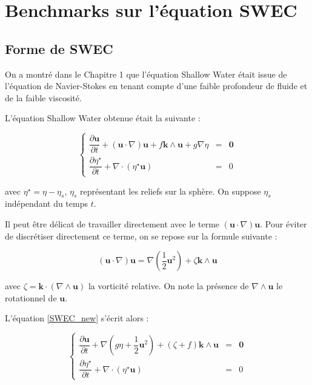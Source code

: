 \chapter{Benchmarks sur l'équation SWEC}

\section{Forme de SWEC}

On a montré dans le Chapitre 1 que l'équation Shallow Water était issue de l'équation de Navier-Stokes en tenant compte d'une faible profondeur de fluide et de la faible viscosité.

L'équation Shallow Water obtenue était la suivante :

\begin{equation}
\label{SWEC_new}
\left\lbrace
\begin{array}{rcl}
\dfrac{\partial \mathbf{u}}{\partial t} + \left( \mathbf{u} \cdot \nabla \right) \mathbf{u} + f \mathbf{k} \wedge \mathbf{u} + g \nabla \eta & = & \mathbf{0} \\
\dfrac{\partial \eta^{\star}}{\partial t} + \nabla \cdot \left( \eta^{\star} \mathbf{u} \right) & = & 0
\end{array}
\right.
\end{equation}

avec $\eta^{\star} = \eta - \eta_s$, $\eta_s$ représentant les reliefs sur la sphère. On suppose $\eta_s$ indépendant du temps $t$.

Il peut être délicat de travailler directement avec le terme $\left( \mathbf{u} \cdot \nabla \right) \mathbf{u}$. Pour éviter de discrétiser directement ce terme, on se repose sur la formule suivante :

\begin{equation}
\left( \mathbf{u} \cdot \nabla \right) \mathbf{u} = \nabla \left( \dfrac{1}{2} \mathbf{u}^2 \right) + \zeta \mathbf{k} \wedge \mathbf{u}
\end{equation}

avec $\zeta = \mathbf{k} \cdot \left( \nabla \wedge \mathbf{u} \right)$ la vorticité relative. On note la présence de $\nabla \wedge \mathbf{u}$ le rotationnel de $\mathbf{u}$.

L'équation \eqref{SWEC_new} s'écrit alors :

\begin{equation}
\label{SWEC_vectform}
\left\lbrace
\begin{array}{rcl}
\dfrac{\partial \mathbf{u}}{\partial t} + \nabla \left( g \eta + \dfrac{1}{2} \mathbf{u}^2  \right) + \left( \zeta + f \right) \mathbf{k} \wedge \mathbf{u} & = & \mathbf{0} \\
\dfrac{\partial \eta^{\star}}{\partial t} + \nabla \cdot \left( \eta^{\star} \mathbf{u} \right) & = & 0
\end{array}
\right.
\end{equation}

